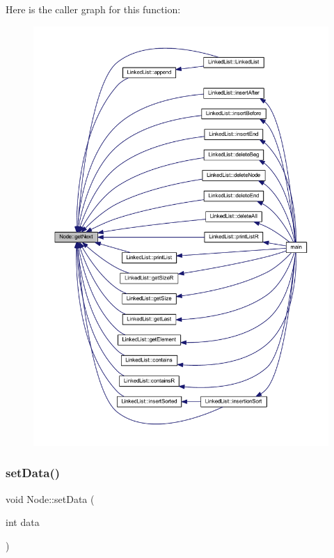 Here is the caller graph for this function\+:
\nopagebreak
\begin{figure}[H]
\begin{center}
\leavevmode
\includegraphics[width=350pt]{class_node_ae36639ff267d63e058ce309fde5a9913_icgraph}
\end{center}
\end{figure}
\mbox{\label{class_node_a0a2c821ab31b604e4fdd7cf39be5cc68}} 
\subsubsection{\texorpdfstring{set\+Data()}{setData()}}
{\footnotesize\ttfamily void Node\+::set\+Data (\begin{DoxyParamCaption}\item[{int}]{data }\end{DoxyParamCaption})}

